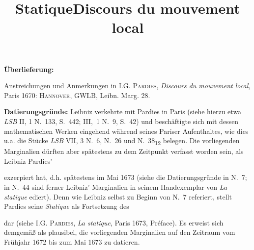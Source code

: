 \begin{ledgroupsized}[r]{120mm}
\footnotesize 
\pstart 
\noindent\textbf{\"{U}berlieferung:}
\pend
\end{ledgroupsized}
\begin{ledgroupsized}[r]{114mm}
\footnotesize 
\pstart \parindent -6mm
%
Anstreichungen und Anmerkungen in \textsc{I.G. Pardies},\cite{00204} \textit{Discours du mouvement local}, Paris 1670: \textsc{Hannover}, GWLB,
 Leibn. Marg. 28. \pend
\end{ledgroupsized}

\vspace*{5mm}
\begin{ledgroup}
\footnotesize 
\pstart
\noindent\footnotesize{\textbf{Datierungsgr\"{u}nde:}
Leibniz verkehrte mit Pardies in Paris (siehe hierzu etwa \textit{LSB} II, 1 N.~133, S.~442; III,~1 N.~9, S.~42) und beschäftigte sich mit dessen mathematischen Werken eingehend während seines Pariser Aufenthaltes,
wie dies u.a. die Stücke \textit{LSB} VII, 3 N.~6, N.~26 und N.~38\textsubscript{12} belegen.
Die vorliegenden Marginalien dürften aber spätestens zu dem Zeitpunkt  verfasst worden sein, als Leibniz Pardies' \title{Statique} exzerpiert hat,
d.h. spätestens im Mai 1673 (siehe die Datierungsgründe in N.~7;
in N.~44
sind ferner Leibniz' Marginalien in seinem Handexemplar von \textit{La statique} ediert).
Denn wie Leibniz selbst zu Beginn von N.~7 referiert,
stellt Pardies seine \textit{Statique} als Fortsetzung des \title{Discours du mouvement local} dar
(siehe \cite{00296}\textsc{I.G. Pardies}, \textit{La statique}, Paris 1673, Préface).
Es erweist sich demgemäß als plausibel, die vorliegenden Marginalien auf den Zeitraum vom Frühjahr 1672 bis zum Mai 1673 zu datieren.}
\pend
\end{ledgroup}


